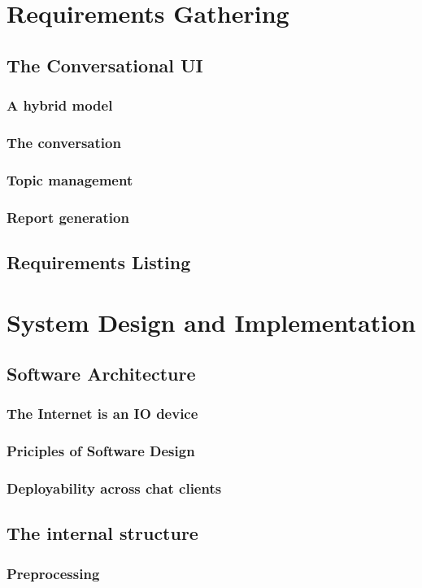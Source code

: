\documentclass[12pt, twoside, a4paper, draft]{report}
\begin{document}
\chapter{Requirements Gathering}
\section{The Conversational UI}
\subsection{A hybrid model}
\subsection{The conversation}
\subsection{Topic management}
\subsection{Report generation}
\section{Requirements Listing}

\chapter{System Design and Implementation}
\section{Software Architecture}
\subsection{The Internet is an IO device}
\subsection{Priciples of Software Design}
\subsection{Deployability across chat clients}
\section{The internal structure}
\subsection{Preprocessing}
\end{document}
